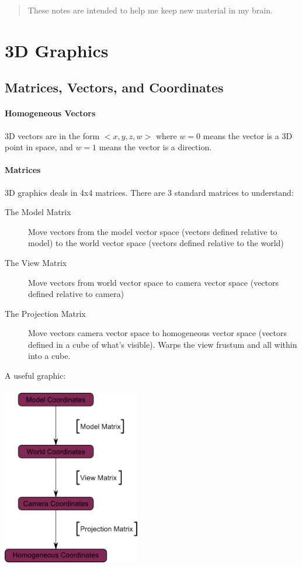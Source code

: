 \documentclass[12pt]{article}
\begin{document}
\maketitle

\begin{abstract}
These notes are intended to help me keep new material in my brain.
\end{abstract}

\newpage

\tableofcontents

\newpage

\section{3D Graphics}

\subsection{Matrices, Vectors, and Coordinates}
\paragraph{Homogeneous Vectors} 3D vectors are in the form $< x, y, z, w>$ where 
$w = 0$ means the vector is a 3D point in space, and $w = 1$ means the vector is a direction.

\paragraph{Matrices} 3D graphics deals in 4x4 matrices. There are 3 standard matrices to
understand:
\begin{description}
	\item[The Model Matrix] Move vectors from the model vector space (vectors defined
		relative to model) to the world vector space (vectors defined relative to the 
		world)
	\item[The View Matrix] Move vectors from world vector space to camera vector
		space (vectors defined relative to camera)
	\item[The Projection Matrix] Move vectors camera vector space to homogeneous
		vector space (vectors defined in a cube of what's visible). Warps the view frustum
		and all within into a cube.
\end{description}

A useful graphic: \\\\
\includegraphics[width=60mm]{img/MVP_Matrices.png}
\cite{opengl}
\end{document}

